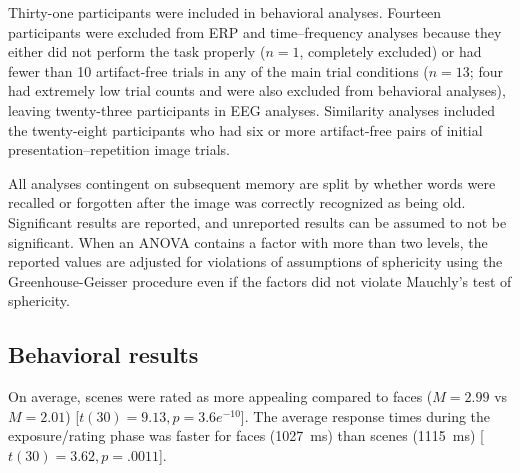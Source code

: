 Thirty-one participants were included in behavioral analyses.  Fourteen participants were excluded from ERP and time--frequency analyses because they either did not perform the task properly ($n=1$, completely excluded) or had fewer than 10 artifact-free trials in any of the main trial conditions ($n=13$; four had extremely low trial counts and were also excluded from behavioral analyses),
leaving twenty-three participants in EEG analyses.  Similarity analyses included the twenty-eight participants who had six or more artifact-free pairs of initial presentation--repetition image trials.

All analyses contingent on subsequent memory are split by whether words were recalled or forgotten after the image was correctly recognized as being old.
Significant results are reported, and unreported results can be assumed to not be significant.
When an ANOVA contains a factor with more than two levels, the reported values are adjusted for violations of assumptions of sphericity using the Greenhouse-Geisser procedure \cite{GreeGeis1959} even if the factors did not violate Mauchly's test of sphericity.

\subsection{Behavioral results}

On average, scenes were rated as more appealing compared to faces ($M=2.99$ vs $M=2.01$) [$t(30)=9.13, p=3.6e^{-10}$].  The average response times during the exposure/rating phase was faster for faces (1027~ms) than scenes (1115~ms) [$t(30)=3.62, p=.0011$].


